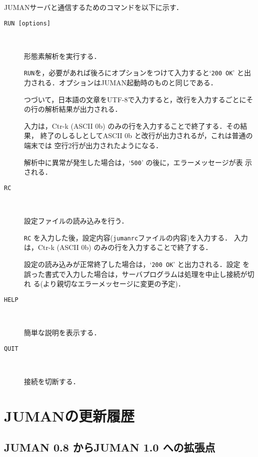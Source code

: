 \documentclass[a4j,titlepage]{jarticle}
\begin{document}
JUMANサーバと通信するためのコマンドを以下に示す．

\begin{description}

\item[{\tt RUN [options]}] ~

形態素解析を実行する．

{\tt RUN}を，必要があれば後ろにオプションをつけて入力すると`{\tt 200
OK}' と出力される．オプションはJUMAN起動時のものと同じである．

つづいて，日本語の文章をUTF-8で入力すると，改行を入力するごとにそ
の行の解析結果が出力される．

入力は，Ctr-k (ASCII 0b) のみの行を入力することで終了する．その結果，
終了のしるしとしてASCII 0b と改行が出力されるが，これは普通の端末では
空行2行が出力されたようになる．

解析中に異常が発生した場合は，`{\tt 500}' の後に，エラーメッセージが表
示される．

\item[{\tt RC}] ~

設定ファイルの読み込みを行う．

{\tt RC} を入力した後，設定内容({\tt jumanrc}ファイルの内容)を入力する．
入力は，Ctr-k (ASCII 0b) のみの行を入力することで終了する．

設定の読み込みが正常終了した場合は，`{\tt 200 OK}' と出力される．設定
を誤った書式で入力した場合は，サーバプログラムは処理を中止し接続が切れ
る(より親切なエラーメッセージに変更の予定)．

\item[{\tt HELP}] ~

簡単な説明を表示する．

\item[{\tt QUIT}] ~

接続を切断する．

\end{description}

\section{JUMANの更新履歴}

\subsection{JUMAN 0.8 からJUMAN 1.0 への拡張点}
\end{document}
